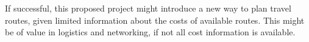 If successful, this proposed project might introduce a new way to plan travel routes, given limited information about the costs of available routes. This might be of value in logistics and networking, if not all cost information is available.






